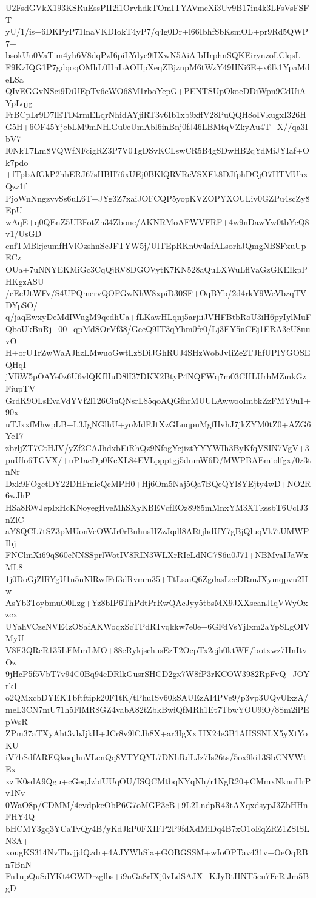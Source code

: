 U2FsdGVkX193KSRuEssPII2i1OrvhdkTOmITYAVmeXi3Uv9B17in4k3LFsVsFSFT
yU/1/is+6DKPyP71lnaVKDIokT4yP7/q4g0Dr+l66IbhfSbKsmOL+pr9Rd5QWP7+
bsokUu0VaTim4yh6V8dqPzI6piLYdye9fIXwN5AiAfbHrphnSQKEirynzoLClqsL
F9KzIQG1P7gdqoqOMhL0HnLAOHpXeqZBjznpM6tWzY49HNi6E+x6lk1YpaMdeLSa
QIvEGGvNSci9DiUEpTv6eWO68M1rboYepG+PENTSUpOkoeDDiWpn9CdUiAYpLqjg
FrBCpLr9D7lETD4rmELqrNhidAYjiRT3v6Ib1xb9xffV28PuQQH8oIVkugxI326H
G5H+6OF45YjcbLM9mNHlGu0eUmAbl6inBnj0fJ46LBMtqVZkyAu4T+X//qa3IbV7
I0NkT7Lm8VQWfNFcigRZ3P7V0TgDSvKCLswCR5B4gSDwHB2qYdMiJYIaf+Ok7pdo
+fTpbAfGkP2hhERJ67sHBH76xUEj0BKlQRVReVSXEk8DJfphDGjO7HTMUhxQzz1f
PjoWnNngzvvSs6uL6T+JYg3Z7xaiJOFCQP5yopKVZOPYXOULiv0GZPu4scZy8EpU
wAqE+q0QEnZ5UBFotZn34Zbonc/AKNRMoAFWVFRF+4w9nDawYw0tbYcQ8v1/UsGD
cnfTMBkjcumfHVlOzshnSeJFTYW5j/UlTEpRKn0v4afALsorhJQmgNBSFxuUpECz
OUa+7uNNYEKMiGc3CqQjRV8DGOVytK7KN528aQuLXWuLflVaGzGKEIkpPHKgzASU
/cEcUtWFv/S4UPQmervQOFGwNhW8xpiD30SF+OqBYb/2d4rkY9WeVbzqTVDYpSO/
q/jaqEwxyDeMdIWugM9qedhUa+fLKawHLqnj5arjiiJVHFBtbRoU3iH6pyIylMuF
QboUkBnRj+00+qpMdSOrVf38/GeeQ9IT3qYhm0fe0/Lj3EY5nCEj1ERA3cU8uuvO
H+orUTrZwWaAJhzLMwuoGwtLzSDiJGhRUJ4SHzWobJvIiZe2TJhfUPIYGOSEQHqI
jVRW5pOAYe0z6U6vlQKfHuD8lI37DKX2BtyP4NQFWq7m03CHLUrhMZmkGzFiupTV
GrdK9OLsEvaVdYVf2l126CiuQNsrL85qoAQGfhrMUULAwwooImbkZzFMY9u1+90x
uTJxxfMhwpLB+L3JgNGlhU+yoMdFJtXzGLuqpuMgfHvhJ7jkZYM0tZ0+AZG6Ye17
zbrljZT7CtHJV/yZf2CAJhdxbEiRhQz9NfogYcjiztYYYWIh3ByKfqVSIN7VgV+3
puUfo6TGVX/+uP1acDp0KeXL84EVLppptgj5dnmW6D/MWPBAEmiolfgx/0z3tnNr
Dxk9FOgctDY22DHFmicQcMPH0+Hj6Om5Naj5Qa7BQeQYl8YEjty4wD+NO2R6wJhP
HSa8RWJepIxHcKNoyegHveMhSXyKBEVcfEOz8985mMnxYM3XTkssbT6UcIJ3nZlC
aY8QCL7tSZ3pMUonVeOWJr0rBnhnsHZzJqdl8ARtjhdUY7gBjQluqVk7tUMWPIbj
FNClmXi69qS60eNNSSprlWotIV8RIN3WLXrRIeLdNG7S6u0J71+NBMvaIJaWxML8
1j0DoGjZlRYgU1n5nNlRwfFrf3dRvmm35+TtLsaiQ6ZgdasLecDRmJXymqpvu2Hw
AsYb3ToybmuO0Lzg+Yz8bIP6ThPdtPrRwQAcJyy5tbsMX9JXXscanJIqVWyOxzcx
UYahVCzeNVE4zOSafAKWoqxScTPdRTvqkkw7e0e+6GFdVsYjIxm2aYpSLgOIVMyU
V8F3QRcR135LEMmLMO+88eRykjschusEzT2OcpTx2cjh0ktWF/botxwz7HnItvOz
9jHcP5f5VbT7v94C0Bq94eDRlkGusrSHCD2gx7W8fP3rKCOW3982RpFvQ+JOYrk1
o2QMxcbDYEKTbftftipk20F1tK/tPhuISv60kSAUEzAI4PVe9/p3vp3UQvUlxzA/
meL3CN7mU71h5FlMR8GZ4vabA82tZbkBwiQfMRh1Et7TbwYOU9iO/8Sm2iPEpWsR
ZPm37aTXyAht3vbJjkH+JCr8v9lCJh8X+ar3IgXxfHX24e3B1AHSSNLX5yXtYoKU
iV7bSdfAREQkoqjhnVLcnQq8VTYQYL7DNhRdLJz7Is26ts/5ox9ki13SbCNVWtEx
xzfK0sdA9Qgu+cGeqJzbfUUqOU/ISQCMtbqNYqNh/r1NgR20+CMmxNknuHrPv1Nv
0WaO8p/CDMM/4evdpkeObP6G7oMGP3cB+9L2LndpR43tAXqxdsypJ3ZbHHnFHY4Q
bHCMY3gq3YCaTvQy4B/yKdJkP0FXIFP2P9fdXdMiDq4B7xO1oEqZRZ1ZSISLN3A+
xougKS314NvTbvjjdQzdr+4AJYWhSla+GOBGSSM+wIoOPTav431v+OeOqRBn7BnN
Fn1upQuSdYKt4GWDrzglbs+i9uGa8rIXj0vLdSAJX+KJyBtHNT5cu7FeRiJm5BgD
